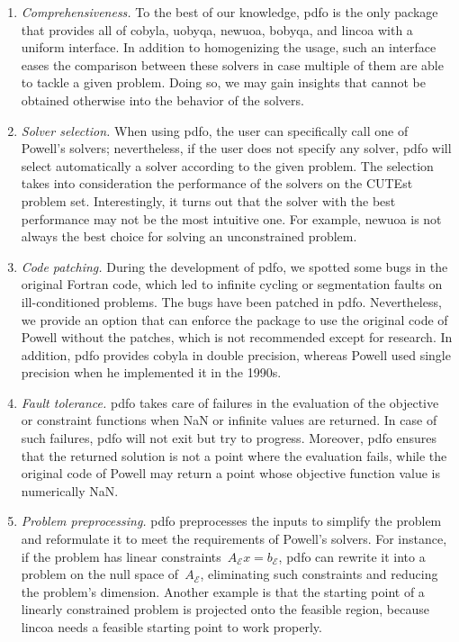\documentclass[11pt,draft]{article}
\numberwithin{equation}{section}
\newcommand{\aeq}{A_{\scriptscriptstyle\mathcal{E}}}
\newcommand{\beq}{b_{\scriptscriptstyle\mathcal{E}}}
\begin{document}
\begin{enumerate}
    \item \emph{Comprehensiveness.}
    To the best of our knowledge, \gls{pdfo} is the only package that provides all of \gls{cobyla}, \gls{uobyqa}, \gls{newuoa}, \gls{bobyqa}, and \gls{lincoa} with a uniform interface.
    In addition to homogenizing the usage, such an interface eases the comparison between these solvers in case multiple of them are able to tackle a given problem.
    Doing so, we may gain insights that cannot be obtained otherwise into the behavior of the
    solvers.

    \item \emph{Solver selection.}
    When using \gls{pdfo}, the user can specifically call one of Powell's solvers; nevertheless, if the user does not specify any solver, \gls{pdfo} will select automatically a solver according to the given problem.
    The selection takes into consideration the performance of the solvers on the CUTEst~\cite{Gould_Orban_Toint_2015} problem set.
    Interestingly, it turns out that the solver with the best performance may not be the most intuitive one.
    For example, \gls{newuoa} is not always the best choice for solving an unconstrained problem.

    \item \emph{Code patching.}
    During the development of \gls{pdfo}, we spotted some bugs in the original Fortran code, which led to infinite cycling or segmentation faults on ill-conditioned problems.
    The bugs have been patched in \gls{pdfo}.
    Nevertheless, we provide an option that can enforce the package to use the original code of Powell without the patches, which is not recommended except for research.
    In addition, \gls{pdfo} provides \gls{cobyla} in double precision, whereas Powell used single precision when he implemented it in the 1990s.

    \item \emph{Fault tolerance.}
    \gls{pdfo} takes care of failures in the evaluation of the objective or constraint functions when NaN or infinite values are returned.
    In case of such failures, \gls{pdfo} will not exit but try to progress.
    Moreover, \gls{pdfo} ensures that the returned solution is not a point where the evaluation fails, while the original code of Powell may return a point whose objective function value is numerically NaN.

    \item \emph{Problem preprocessing.}
    \gls{pdfo} preprocesses the inputs to simplify the problem and reformulate it to meet the requirements of Powell's solvers.
    For instance, if the problem has linear constraints~$\aeq x = \beq$, \gls{pdfo} can rewrite it into a problem on the null space of~$\aeq$, eliminating such constraints and reducing the problem's dimension.
    Another example is that the starting point of a linearly constrained problem is projected onto the feasible region, because \gls{lincoa} needs a feasible starting point to work properly.


\end{enumerate}
\end{document}
